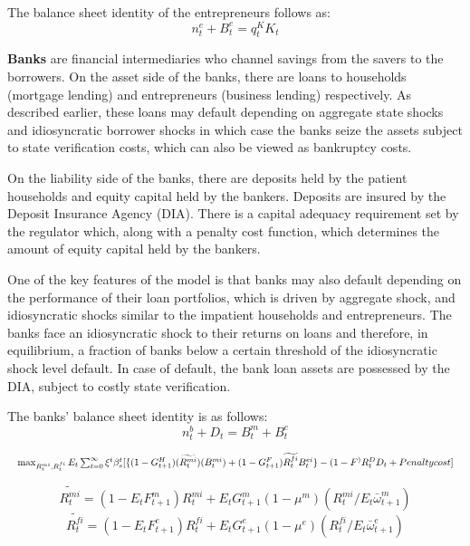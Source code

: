 \documentclass[12pt]{article}
\numberwithin{equation}{section}
\begin{document}
The balance sheet identity of the entrepreneurs follows as:
\begin{equation}
n^e_t+B^e_t=q^K_t K_t
\end{equation}

\noindent
\textbf{Banks } are financial intermediaries who channel savings from the savers to the borrowers. On the asset side of the banks, there are loans to households (mortgage lending) and entrepreneurs (business lending) respectively. As described earlier, these loans may default depending on aggregate state shocks and idiosyncratic borrower shocks in which case the banks seize the assets subject to state verification costs, which can also be viewed as bankruptcy costs. 


On the liability side of the banks, there are deposits held by the patient households and equity capital held by the bankers. Deposits are insured by the Deposit Insurance Agency (DIA). There is a capital adequacy requirement set by the regulator which, along with a penalty cost function, which determines the amount of equity capital held by the bankers.

One of the key features of the model  is that banks may also default depending on the performance of their loan portfolios, which is driven by aggregate shock, and idiosyncratic shocks similar to the impatient households and entrepreneurs.
 The banks face an idiosyncratic shock to their returns on loans and therefore, in equilibrium, a fraction of banks below a certain threshold of the idiosyncratic shock level default. In case of default, the bank loan assets are possessed by the DIA, subject to costly state verification. 

The banks' balance sheet identity is as follows:
\begin{equation}
n^b_{t}+D_{t}=B^m_{t}+B^e_{t}
\end{equation}




\begin{equation}
\resizebox{1\textwidth}{!}{$
	\max_{R^{mi}_t,R^{fi}_t}E_t\sum _{t=0}^{\infty }\xi^t\beta_{s}^t [\{(1-G^H_{t+1}) (\widetilde{R^{mi}_{t}})(B^{mi}_{t})+(1-G^F_{t+1})\widetilde{R^{fi}_{t}}B^{ei}_{t}\}-(1-F^){R^D_{t}}D_{t}+Penalty cost]$}
\end{equation}



\begin{equation}
\widetilde{R^{mi}_{t}}=(1-E_tF^m_{t+1})R^{mi}_t+E_tG^m_{t+1}(1 - \mu^m)( R^{mi}_t/E_t\bar{\omega}^m_{t+1})
\end{equation}
\begin{equation}
\widetilde{R^{fi}_{t}}=(1-E_tF^e_{t+1})R^{fi}_t+E_tG^e_{t+1}(1 - \mu^e)( R^{fi}_t/E_t\bar{\omega}^e_{t+1})
\end{equation}
\end{document}
